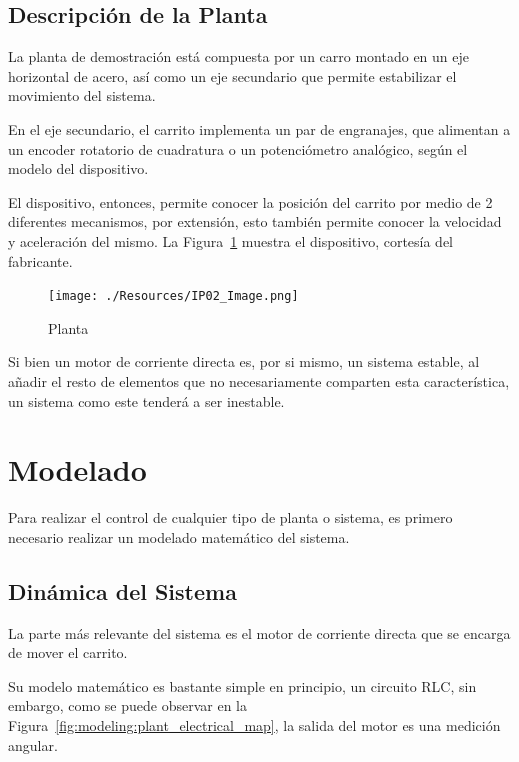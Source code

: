 \documentclass[12pt,a4paper]{article}
\begin{document}
      \subsection{Descripción de la Planta}

        La planta de demostración está compuesta por un carro montado en un eje horizontal de acero, así como un 
        eje secundario que permite estabilizar el movimiento del sistema.

        En el eje secundario, el carrito implementa un par de engranajes, que alimentan a un encoder rotatorio de 
        cuadratura o un potenciómetro analógico, según el modelo del dispositivo. 

        El dispositivo, entonces, permite conocer la posición del carrito por medio de 2 diferentes mecanismos, 
        por extensión, esto también permite conocer la velocidad y aceleración del mismo. La Figura~\ref{fig:intro:planta}
        muestra el dispositivo, cortesía del fabricante.

        \begin{figure}
          \centering
          \texttt{[image: ./Resources/IP02\_Image.png]}
          \caption{Planta}
          \label{fig:intro:planta}
        \end{figure}

        Si bien un motor de corriente directa es, por si mismo, un sistema estable, al añadir el resto de 
        elementos que no necesariamente comparten esta característica, un sistema como este tenderá a ser 
        inestable.

        \pagebreak

	  \section{Modelado}

      Para realizar el control de cualquier tipo de planta o sistema, es primero necesario realizar un modelado 
      matemático del sistema. 
        
      \subsection{Dinámica del Sistema}

        La parte más relevante del sistema es el motor de corriente directa que se encarga de mover el carrito. 
        
        Su modelo matemático es bastante simple en principio, un circuito RLC, sin embargo, como se puede observar en la
        Figura~\ref{fig:modeling:plant_electrical_map}, la salida del motor es una medición angular. 
\end{document}
